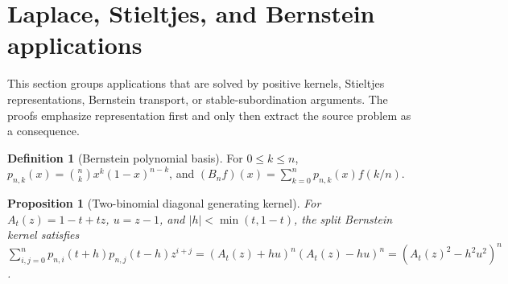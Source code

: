 \documentclass[11pt]{article}
\numberwithin{equation}{section}
\newtheorem{proposition}[theorem]{Proposition}
\theoremstyle{definition}
\newtheorem{definition}{Definition}[section]
\theoremstyle{remark}
\newcommand{\1}{\mathbf 1}
\begin{document}
\section{Laplace, Stieltjes, and Bernstein applications}
\label{sec:laplace-stieltjes-and-bernstein-applications}
This section groups applications that are solved by positive kernels, Stieltjes representations, Bernstein transport, or stable-subordination arguments.  The proofs emphasize representation first and only then extract the source problem as a consequence.

\begin{definition}[Bernstein polynomial basis]
\label{res:bernstein-polynomial-basis}
For \(0\le k\le n\), \(p_{n,k}(x)=\binom nkx^k(1-x)^{n-k}\), and \((B_nf)(x)=\sum_{k=0}^n p_{n,k}(x)f(k/n)\).
\end{definition}

\begin{proposition}[Two-binomial diagonal generating kernel]
\label{res:twobinomial-diagonal-generating-kernel}
For \(A_t(z)=1-t+tz\), \(u=z-1\), and \(|h|<\min(t,1-t)\), the split Bernstein kernel satisfies \(\sum_{i,j=0}^n p_{n,i}(t+h)p_{n,j}(t-h)z^{i+j}=(A_t(z)+hu)^n(A_t(z)-hu)^n=(A_t(z)^2-h^2u^2)^n\).
\end{proposition}
\end{document}
